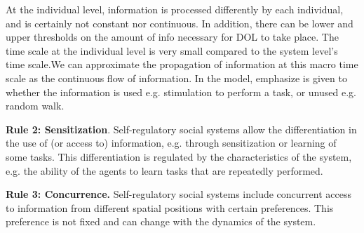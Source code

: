 \documentclass[preprint,12pt]{elsarticle}
\begin{document}
At the individual level, information is processed differently by each individual, and is certainly not constant nor continuous. In addition, there can be lower and upper thresholds on the amount of info necessary for DOL to take place. The time scale at the individual level is very small compared to the system level's time scale.We can approximate the propagation of information at this macro time scale as the continuous flow of information.  In the model, emphasize is given to whether the information is used e.g. stimulation to perform a task, or unused e.g. random walk.

\textbf{Rule 2: Sensitization}. Self-regulatory social systems allow the differentiation in the use of  (or access to) information, e.g. through sensitization or learning of some tasks. This differentiation is regulated by the characteristics of the system, e.g. the ability of the agents to learn tasks that are repeatedly performed.

\textbf{Rule 3: Concurrence.} Self-regulatory social systems include concurrent access to information from different spatial positions with certain preferences. This preference is not fixed and can change with the dynamics of the system. 
\end{document}
